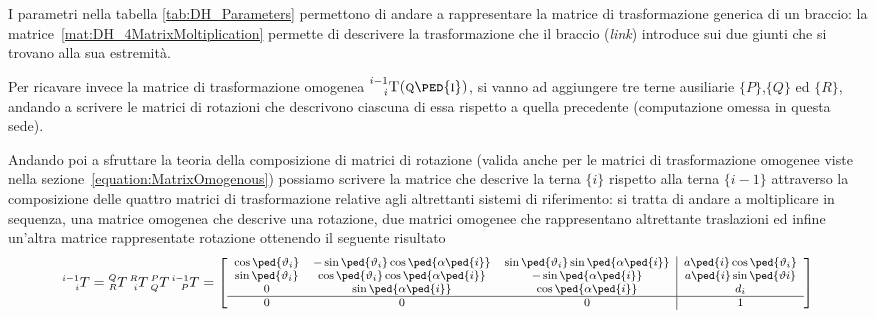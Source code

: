 I parametri nella tabella \ref{tab:DH_Parameters} permettono di andare a rappresentare la matrice di trasformazione generica di un braccio: la matrice~\vref{mat:DH_4MatrixMoltiplication} permette di descrivere la trasformazione che il braccio (\emph{link}) introduce sui due giunti che si trovano alla sua estremità.

Per ricavare invece la matrice di trasformazione omogenea  
$\prescript{i-1}{i}{\textsc{T(q\ped{i})}}$, si vanno ad aggiungere tre terne ausiliarie $\{P\}$,$\{Q\}$ ed $\{R\}$, andando a scrivere le matrici di rotazioni che descrivono ciascuna di essa rispetto a quella precedente (computazione omessa in questa sede).

Andando poi a sfruttare la teoria della composizione di matrici di rotazione  (valida anche per le matrici di trasformazione omogenee viste nella sezione~\vref{equation:MatrixOmogenous}) possiamo scrivere la matrice che descrive la terna $\{i\}$ rispetto alla terna $\{i-1\}$ attraverso la composizione delle quattro matrici di trasformazione relative agli altrettanti sistemi di riferimento: si tratta di andare a moltiplicare in sequenza, una matrice omogenea che descrive una rotazione, due matrici omogenee che rappresentano altrettante traslazioni ed infine un'altra matrice rappresentate rotazione ottenendo il seguente risultato
\begin{equation}
	\footnotesize
	\label{mat:DH_4MatrixMoltiplication}
	\prescript{i-1}{i}{T}	= \prescript{Q}{R}{T} \prescript{R}{i}{T} \prescript{P}{Q}{T} \prescript{i-1}{P}{T}  =
	\begin{bmatrix}
		\begin{array}{ccc|c}
			\begin{matrix}
				\cos \ped{\theta_i}\\
				\sin \ped{\theta_i}\\	
				0
			\end{matrix}
			& 
			\begin{matrix}
				-\sin \ped{\theta_i} \cos \ped{\alpha\ped{i}}\\
				\cos\ped{\theta_i} \cos \ped{\alpha\ped{i}}\\	
				\sin \ped{\alpha\ped{i}}
			\end{matrix}
			&
			\begin{matrix}
				\sin \ped{\theta_i} \sin\ped{\alpha\ped{i}}\\
				-\sin \ped{\alpha\ped{i}}\\	
				\cos \ped{\alpha\ped{i}}
			\end{matrix}
			&
			\begin{matrix}
				a\ped{i} \cos \ped{\theta_i}\\
				a\ped{i} \sin \ped{\theta{i}}\\
				d_i
			\end{matrix}
			\\
			\hline
			0 & 0 & 0 & 1
		\end{array}
	\end{bmatrix}
\end{equation}


